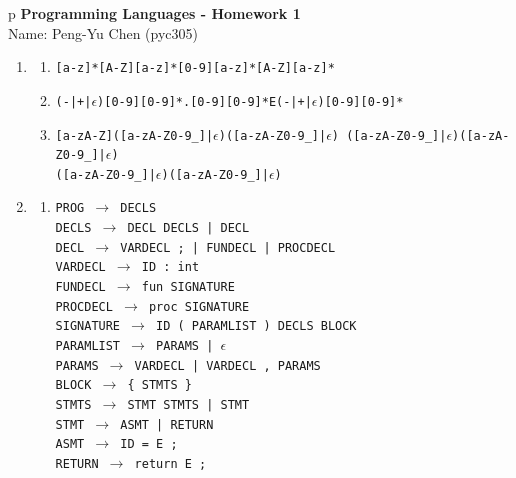 \documentclass[a4paper,11pt]{article} %
\newcommand{\code}[1]{\texttt{#1}}
\begin{document}
\thispagestyle{empty}

\begin{tabular}{p\linewidth}
{\large \bf Programming Languages - Homework 1} \\ Name: Peng-Yu Chen (pyc305) \\
\hline
\end{tabular}

\vspace{0.4cm}

\begin{enumerate}
  \item %
  \begin{enumerate}
    \item \code{[a-z]*[A-Z][a-z]*[0-9][a-z]*[A-Z][a-z]*}
    \item \code{(-|+|$\epsilon$)[0-9][0-9]*.[0-9][0-9]*E(-|+|$\epsilon$)[0-9][0-9]*}
    \item \code{[a-zA-Z]([a-zA-Z0-9\_]|$\epsilon$)([a-zA-Z0-9\_]|$\epsilon$)
      ([a-zA-Z0-9\_]|$\epsilon$)([a-zA-Z0-9\_]|$\epsilon$) \\
      ([a-zA-Z0-9\_]|$\epsilon$)([a-zA-Z0-9\_]|$\epsilon$)}
  \end{enumerate}

  \item %
  \begin{enumerate}
    \item %
    \code{PROG $\to$ DECLS} \\
    \code{DECLS $\to$ DECL DECLS | DECL} \\
    \code{DECL $\to$ VARDECL ; | FUNDECL | PROCDECL} \\

    \code{VARDECL $\to$ ID : int} \\
    \code{FUNDECL $\to$ fun SIGNATURE } \\
    \code{PROCDECL $\to$ proc SIGNATURE } \\
    \code{SIGNATURE $\to$ ID ( PARAMLIST ) DECLS BLOCK } \\

    \code{PARAMLIST $\to$ PARAMS | $\epsilon$} \\
    \code{PARAMS $\to$ VARDECL | VARDECL , PARAMS} \\
    \code{BLOCK $\to$ \{ STMTS \}} \\

    \code{STMTS $\to$ STMT STMTS | STMT} \\
    \code{STMT $\to$ ASMT | RETURN} \\
    \code{ASMT $\to$ ID = E ;} \\
    \code{RETURN $\to$ return E ;} \\


\end{enumerate}
\end{enumerate}
\end{document}
